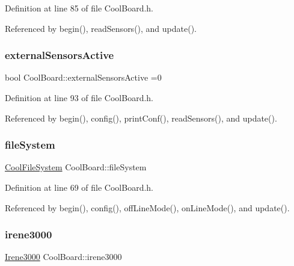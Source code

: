 Definition at line 85 of file Cool\+Board.\+h.



Referenced by begin(), read\+Sensors(), and update().

\mbox{\label{classCoolBoard_a638b00b76aeb819ecfd4c10b8cdd7bb7}} 
\subsubsection{\texorpdfstring{external\+Sensors\+Active}{externalSensorsActive}}
{\footnotesize\ttfamily bool Cool\+Board\+::external\+Sensors\+Active =0\hspace{0.3cm}{\ttfamily [private]}}



Definition at line 93 of file Cool\+Board.\+h.



Referenced by begin(), config(), print\+Conf(), read\+Sensors(), and update().

\mbox{\label{classCoolBoard_a42c2586fbb13ff7f06538e9284e8538d}} 
\subsubsection{\texorpdfstring{file\+System}{fileSystem}}
{\footnotesize\ttfamily \hyperlink{classCoolFileSystem}{Cool\+File\+System} Cool\+Board\+::file\+System\hspace{0.3cm}{\ttfamily [private]}}



Definition at line 69 of file Cool\+Board.\+h.



Referenced by begin(), config(), off\+Line\+Mode(), on\+Line\+Mode(), and update().

\mbox{\label{classCoolBoard_ad103718ce316006c4695b8eb312eaf11}} 
\subsubsection{\texorpdfstring{irene3000}{irene3000}}
{\footnotesize\ttfamily \hyperlink{classIrene3000}{Irene3000} Cool\+Board\+::irene3000\hspace{0.3cm}{\ttfamily [private]}}



